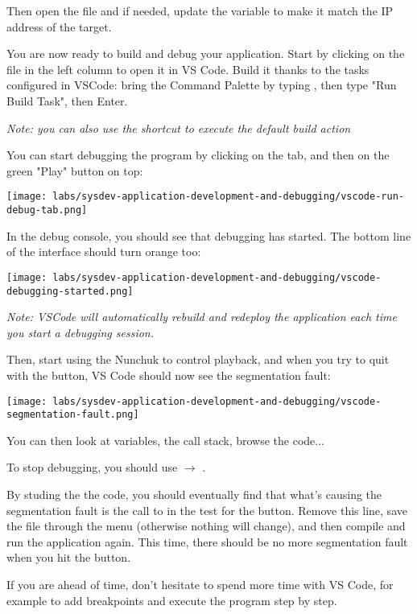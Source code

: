 Then open the  file and if needed, update the  variable
to make it match the IP address of the target.

You are now ready to build and debug your application. Start by clicking on
the  file in the left column to open it in VS
Code. Build it thanks to the tasks configured in VSCode: bring the Command
Palette by typing , then type "Run Build Task", then
Enter.

\textit{Note: you can also use the  shortcut to execute the
default build action}

You can start debugging the program by clicking on the 
tab, and then on the green "Play" button on top:

\texttt{[image: labs/sysdev-application-development-and-debugging/vscode-run-debug-tab.png]}

In the debug console, you should see that debugging has started. The
bottom line of the interface should turn orange too:

\texttt{[image: labs/sysdev-application-development-and-debugging/vscode-debugging-started.png]}

\textit{Note: VSCode will automatically rebuild and redeploy the
application each time you start a debugging session.}

Then, start using the Nunchuk to control playback, and when you try to
quit with the  button, VS Code should now see the segmentation
fault:

\texttt{[image: labs/sysdev-application-development-and-debugging/vscode-segmentation-fault.png]}

You can then look at variables, the call stack, browse the code...

To stop debugging, you should use  $\rightarrow$ .

By studing the the code, you should eventually find that what's causing
the segmentation fault is the call to  in the test for the
 button. Remove this line, save the file through the 
menu (otherwise nothing will change), and then compile and run the
application again. This time, there should be no more segmentation fault
when you hit the  button.

If you are ahead of time, don't hesitate to spend more time with VS
Code, for example to add breakpoints and execute the program step by
step.

